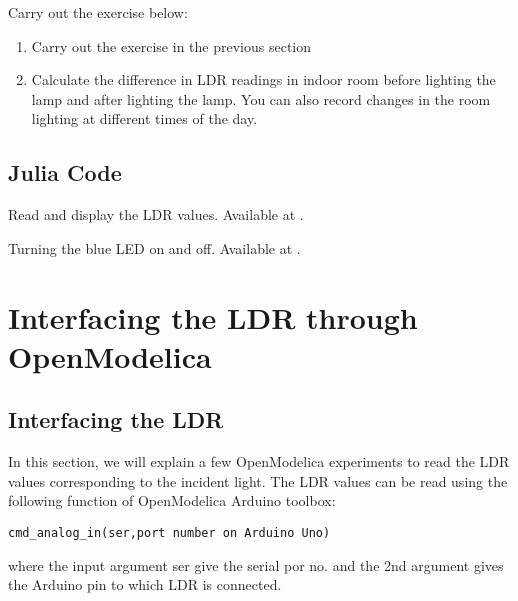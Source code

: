 \begin{exercise}
Carry out the exercise below:
\begin{enumerate}
\item Carry out the exercise in the previous section
\item Calculate the difference in LDR readings in indoor room
  before lighting the lamp and after lighting the lamp. You can also
  record changes in the room lighting at different times of the day.
\end{enumerate}
\end{exercise}

\subsection{Julia Code}
\label{sec:ldr-julia-code}

\begin{juliacode}
{Read and display the LDR values.  Available at
  .}
\label{julia:ldr-read}

\end{juliacode}

\begin{juliacode}
{Turning the blue LED on and off.  Available at
  .}
\label{julia:ldr-led}

\end{juliacode}

\section{Interfacing the LDR through OpenModelica}
\subsection{Interfacing the LDR}
In this section, we will explain a few OpenModelica experiments to read the
LDR values corresponding to the incident light. The LDR values can be
read using the following function of OpenModelica Arduino toolbox:
\begin{lstlisting}[style=nonumbers]
  cmd_analog_in(ser,port number on Arduino Uno)
\end{lstlisting}
where the input argument ser give the serial por no. and the 2nd argument gives the Arduino pin to which 
LDR is connected.

